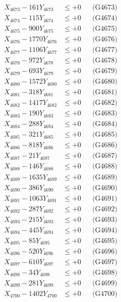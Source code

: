 \documentclass[a4paper,10pt]{article}
\begin{document}
{\begin{align}
X_{4673} - 161Y_{4673} &\leq +0 && \text{(G4673)} \\
X_{4674} - 115Y_{4674} &\leq +0 && \text{(G4674)} \\
X_{4675} - 900Y_{4675} &\leq +0 && \text{(G4675)} \\
X_{4676} - 1770Y_{4676} &\leq +0 && \text{(G4676)} \\
X_{4677} - 1106Y_{4677} &\leq +0 && \text{(G4677)} \\
X_{4678} - 972Y_{4678} &\leq +0 && \text{(G4678)} \\
X_{4679} - 693Y_{4679} &\leq +0 && \text{(G4679)} \\
X_{4680} - 1572Y_{4680} &\leq +0 && \text{(G4680)} \\
\allowbreak
X_{4681} - 318Y_{4681} &\leq +0 && \text{(G4681)} \\
X_{4682} - 1417Y_{4682} &\leq +0 && \text{(G4682)} \\
X_{4683} - 190Y_{4683} &\leq +0 && \text{(G4683)} \\
X_{4684} - 288Y_{4684} &\leq +0 && \text{(G4684)} \\
X_{4685} - 321Y_{4685} &\leq +0 && \text{(G4685)} \\
X_{4686} - 818Y_{4686} &\leq +0 && \text{(G4686)} \\
X_{4687} - 21Y_{4687} &\leq +0 && \text{(G4687)} \\
X_{4688} - 146Y_{4688} &\leq +0 && \text{(G4688)} \\
X_{4689} - 1635Y_{4689} &\leq +0 && \text{(G4689)} \\
X_{4690} - 386Y_{4690} &\leq +0 && \text{(G4690)} \\
\allowbreak
X_{4691} - 1063Y_{4691} &\leq +0 && \text{(G4691)} \\
X_{4692} - 287Y_{4692} &\leq +0 && \text{(G4692)} \\
X_{4693} - 215Y_{4693} &\leq +0 && \text{(G4693)} \\
X_{4694} - 445Y_{4694} &\leq +0 && \text{(G4694)} \\
X_{4695} - 85Y_{4695} &\leq +0 && \text{(G4695)} \\
X_{4696} - 520Y_{4696} &\leq +0 && \text{(G4696)} \\
X_{4697} - 610Y_{4697} &\leq +0 && \text{(G4697)} \\
X_{4698} - 34Y_{4698} &\leq +0 && \text{(G4698)} \\
X_{4699} - 281Y_{4699} &\leq +0 && \text{(G4699)} \\
X_{4700} - 1402Y_{4700} &\leq +0 && \text{(G4700)} \\

\end{align}}
\end{document}

